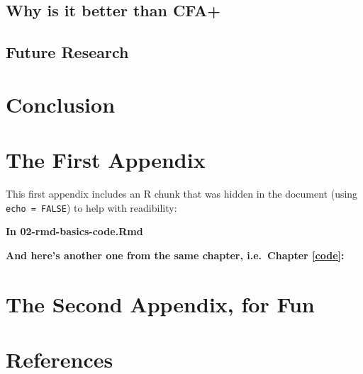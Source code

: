 \documentclass[a4paper, nobind]{templates/ociamthesis}
\begin{document}
\section{Why is it better than CFA+}\label{why-is-it-better-than-cfa}

\section{Future Research}\label{future-research}

\chapter*{Conclusion}\label{conclusion}

\startappendices

\chapter{The First Appendix}\label{the-first-appendix}

This first appendix includes an R chunk that was hidden in the document (using \texttt{echo\ =\ FALSE}) to help with readibility:

\textbf{In 02-rmd-basics-code.Rmd}

\textbf{And here's another one from the same chapter, i.e.~Chapter \ref{code}:}

\chapter{The Second Appendix, for Fun}\label{the-second-appendix-for-fun}

\chapter*{References}\label{references}

\end{document}

